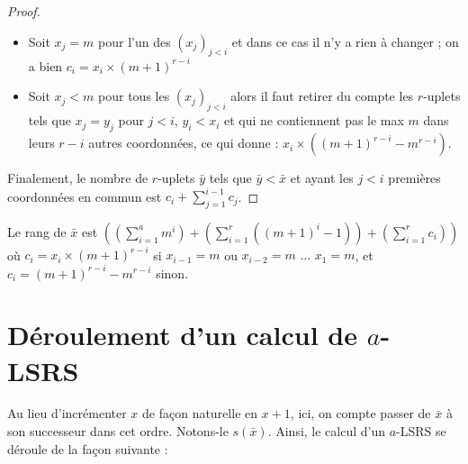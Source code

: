 \documentclass{report}
\begin{document}
\begin{proof}
			\begin{itemize}[itemsep=-1mm]
				\item	Soit $x_j = m$ pour l'un des $\left(x_j\right)_{j < i}$ et dans ce cas il n'y a rien à changer ; on a bien $c_i = x_i \times \left(m+1\right)^{r-i}$
				\item 	Soit $x_j < m$ pour tous les $\left(x_j\right)_{j < i}$ alors il faut retirer du compte les $r$-uplets tels que $x_j = y_j$ pour $j < i$, $y_i < x_i$ et qui ne contiennent pas le max $m$ dans leurs $r-i$ autres coordonnées, ce qui donne : $x_i \times \left(\left(m+1\right)^{r-i} - m^{r-i}\right)$.
			\end{itemize}
			
			Finalement, le nombre de $r$-uplets $\bar{y}$ tels que $\bar{y} < \bar{x}$ et ayant les $j<i$ premières coordonnées en commun est $c_i + \sum_{j=1}^{i-1} c_j$.
		\end{proof}
		
		\begin{coro}
			\label{coro:rang_bon_ordre}
			Le rang de $\bar{x}$ est $\left( \left( \sum_{i=1}^{a} m^i \right) + \left( \sum_{i=1}^{r} \left( \left(m+1\right)^i -1 \right) \right) + \left(\sum_{i=1}^{r} c_i \right) \right)$ où $c_i = x_i \times \left(m+1\right)^{r-i}$ si $x_{i-1} = m$ ou $x_{i-2} = m$ $\dots$ $x_{1} = m$, et $c_i = \left(m+1\right)^{r-i}-m^{r-i}$ sinon. 
		\end{coro}
		
		
	
	\section{Déroulement d'un calcul de $a$-LSRS}
	\label{par:deroulement_aLSRS}
	Au lieu d'incrémenter $x$ de façon naturelle en $x+1$, ici, on compte passer de $\bar{x}$ à son successeur dans cet ordre. Notons-le $s\left(\bar{x}\right)$. Ainsi, le calcul d'un $a$-LSRS se déroule de la façon suivante :
	
\end{document}
